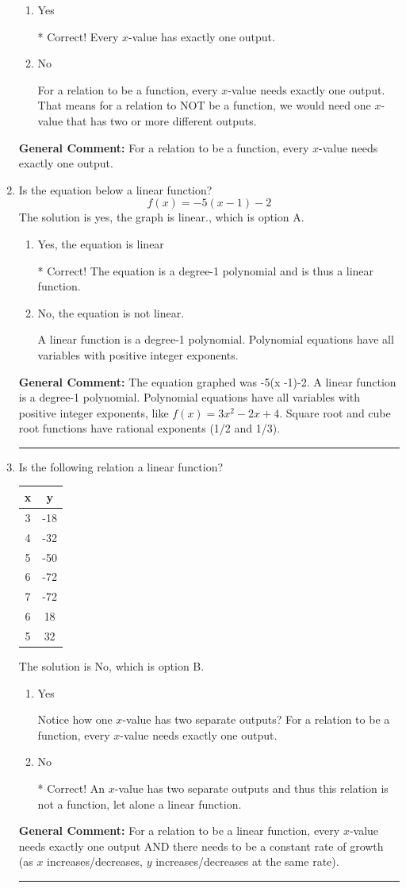 \documentclass{extbook}[14pt]
\newcommand{\litem}[1]{\item #1

\rule{\textwidth}{0.4pt}}
\begin{document}
\begin{enumerate}
{\begin{enumerate}[label=\Alph*.]
\item Yes

* Correct! Every $x$-value has exactly one output.
\item No

For a relation to be a function, every $x$-value needs exactly one output. That means for a relation to NOT be a function, we would need one $x$-value that has two or more different outputs.
\end{enumerate}


\textbf{General Comment:} For a relation to be a function, every $x$-value needs exactly one output.
}
\litem{
Is the equation below a linear function?
\[ f(x) = -5(x -1)-2 \]The solution is yes, the graph is linear., which is option A.

\begin{enumerate}[label=\Alph*.]
\item Yes, the equation is linear

* Correct! The equation is a degree-1 polynomial and is thus a linear function.
\item No, the equation is not linear.

A linear function is a degree-1 polynomial. Polynomial equations have all variables with positive integer exponents.
\end{enumerate}


\textbf{General Comment:} The equation graphed was -5(x -1)-2. A linear function is a degree-1 polynomial. Polynomial equations have all variables with positive integer exponents, like $f(x) = 3x^2-2x+4$. Square root and cube root functions have rational exponents (1/2 and 1/3).
}
\litem{
Is the following relation a linear function?


\begin{tabular}{c|c}
x &y\tabularnewline \hline
3 &-18\tabularnewline \hline
4 &-32\tabularnewline \hline
5 &-50\tabularnewline \hline
6 &-72\tabularnewline \hline
7 &-72\tabularnewline \hline
6 &18\tabularnewline \hline
5 &32\end{tabular}The solution is No, which is option B.

\begin{enumerate}[label=\Alph*.]
\item Yes

Notice how one $x$-value has two separate outputs? For a relation to be a function, every $x$-value needs exactly one output.
\item No

* Correct! An $x$-value has two separate outputs and thus this relation is not a function, let alone a linear function.
\end{enumerate}


\textbf{General Comment:} For a relation to be a linear function, every $x$-value needs exactly one output AND there needs to be a constant rate of growth (as $x$ increases/decreases, $y$ increases/decreases at the same rate).
}
\end{enumerate}
\end{document}
